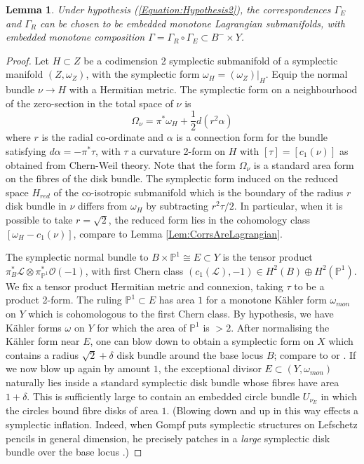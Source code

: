 \documentclass[reqno,10pt]{amsart}
\numberwithin{equation}{section}
\newcommand{\bP}{{\mathbb P}}
\newtheorem{Lemma}[thm]{Lemma}
\theoremstyle{remark}
\begin{document}
\begin{Lemma} \label{Lem:Monotone}
Under hypothesis (\ref{Equation:Hypothesis2}), the correspondences $\Gamma_E$ and $\Gamma_R$ can be chosen to be embedded monotone Lagrangian submanifolds, with embedded monotone composition  $\Gamma = \Gamma_R \circ \Gamma_E \subset B^- \times Y$.
\end{Lemma}

\begin{proof}
Let $H \subset Z$ be a codimension 2 symplectic submanifold of a symplectic manifold $(Z,\omega_Z)$, with the symplectic form $\omega_H = (\omega_Z)|_H$.  Equip the normal bundle $\nu \rightarrow H$ with a Hermitian metric. The symplectic form on a neighbourhood of the zero-section in the total space of  $\nu$  is 
 \begin{equation} \label{Eqn:SymplecticDiskBundle}
\Omega_{\nu}  = \pi^*\omega_H + \frac{1}{2} d(r^2 \alpha)
\end{equation}
where $r$ is the radial co-ordinate and $\alpha$ is a connection form for the bundle satisfying $d\alpha = -\pi^*\tau$, with $\tau$ a curvature 2-form on $H$ with  $[\tau] = [c_1(\nu)]$ as obtained from Chern-Weil theory.  Note that the form $\Omega_{\nu}$ is a standard area form on the fibres of the disk bundle.
 The symplectic form induced on the reduced space $H_{red}$ of the co-isotropic submanifold which is the boundary of the radius $r$ disk bundle in $\nu$ differs from $\omega_H$ by subtracting $r^2 \tau / 2$.  In particular, when it is possible to take  $r=\sqrt{2}$, the reduced form lies in the cohomology class $[\omega_H - c_1(\nu)]$, compare to Lemma \ref{Lem:CorrsAreLagrangian}. 

The symplectic normal bundle to $B \times \bP^1 \cong E \subset Y$ is the tensor product $\pi_B^* \mathcal{L} \otimes \pi_{\bP^1}^* \mathcal{O}(-1)$, with first Chern class  $(c_1(\mathcal{L}),-1) \in H^2(B) \oplus H^2(\bP^1)$.  We fix a tensor product Hermitian metric and connexion, taking $\tau$ to be a product 2-form.   The ruling $\bP^1 \subset E$ has area $1$ for a monotone K\"ahler form $\omega_{mon}$ on $Y$ which is cohomologous to the first Chern class.  By hypothesis, we have K\"ahler forms $\omega$  on $Y$ for which the area of $\bP^1$ is $> 2$.  After normalising the K\"ahler form near $E$, one can blow down to obtain a symplectic form on $X$ which contains a radius $\sqrt{2}+\delta$ disk bundle around the base locus $B$; compare to \cite[Lemma 7.11]{McD-S} or \cite[Theorem 2.3]{Gompf}. If we now blow up again by amount $1$, the exceptional divisor $E\subset (Y, \omega_{mon})$ naturally lies inside a standard symplectic disk bundle whose fibres have area $1+\delta$.  This is sufficiently large to contain an embedded circle bundle $U_{\nu_E}$ in which the circles bound fibre disks of area $1$.  (Blowing down and up in this way effects a symplectic inflation.  Indeed, when Gompf puts symplectic structures on Lefschetz pencils in general dimension, he precisely patches in a \emph{large} symplectic disk bundle over the base locus \cite[p.279, and his embedding $\varphi$ onto a disk bundle of radius $R$]{Gompf}.)


\end{proof}
\end{document}
